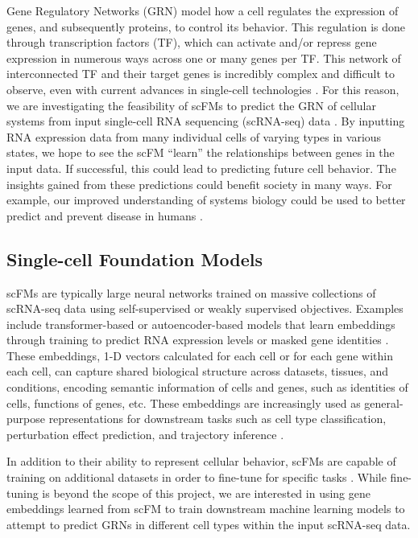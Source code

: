 \documentclass[12pt, letterpaper]{report}
\begin{document}
Gene Regulatory Networks (GRN) model how a cell regulates the expression of genes, and subsequently proteins, to control its behavior. This regulation is done through transcription factors (TF), which can activate and/or repress gene expression in numerous ways across one or many genes per TF. This network of interconnected TF and their target genes is incredibly complex and difficult to observe, even with current advances in single-cell technologies \cite{grn}. For this reason, we are investigating the feasibility of scFMs to predict the GRN of cellular systems from input single-cell RNA sequencing (scRNA-seq) data \cite{scRNA-seq}. By inputting RNA expression data from many individual cells of varying types in various states, we hope to see the scFM ``learn'' the relationships between genes in the input data. If successful, this could lead to predicting future cell behavior. The insights gained from these predictions could benefit society in many ways. For example, our improved understanding of systems biology could be used to better predict and prevent disease in humans \cite{scEval_framework}.

\subsection{Single-cell Foundation Models}

scFMs are typically large neural networks trained on massive collections of scRNA-seq data using self-supervised or weakly supervised objectives. Examples include transformer-based or autoencoder-based models that learn embeddings through training to predict RNA expression levels or masked gene identities \cite{scFM_survey}. These embeddings, 1-D vectors calculated for each cell or for each gene within each cell, can capture shared biological structure across datasets, tissues, and conditions, encoding semantic information of cells and genes, such as identities of cells, functions of genes, etc. These embeddings are increasingly used as general-purpose representations for downstream tasks such as cell type classification, perturbation effect prediction, and trajectory inference \cite{scfm_benchmarking}. 

In addition to their ability to represent cellular behavior, scFMs are capable of training on additional datasets in order to fine-tune for specific tasks \cite{scFM_survey}. While fine-tuning is beyond the scope of this project,  we are interested in using gene embeddings learned from scFM to train downstream machine learning models to attempt to predict GRNs in different cell types within the input scRNA-seq data.
\end{document}
